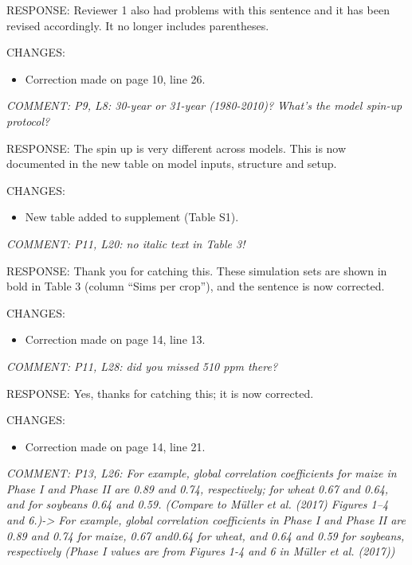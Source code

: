 \documentclass[gmd, manuscript]{copernicus} %
\begin{document}
RESPONSE: Reviewer 1 also had problems with this sentence and it has been revised accordingly. It no longer includes parentheses.
\smallskip

CHANGES:
\begin{itemize}
    \item Correction made on page 10, line 26.
\end{itemize}

\smallskip

\textcolor{dark-gray}{\textit{COMMENT: P9, L8: 30-year or 31-year (1980-2010)? What’s the model spin-up protocol?}}

RESPONSE: The spin up is very different across models. This is now documented in the new table on model inputs, structure and setup.
\smallskip

CHANGES:
\begin{itemize}
    \item New table added to supplement (Table S1).
\end{itemize}

\smallskip

\textcolor{dark-gray}{\textit{COMMENT: P11, L20: no italic text in Table 3!}}

RESPONSE: Thank you for catching this. These simulation sets are shown in bold in Table 3 (column “Sims per crop”), and the sentence is now corrected.
\smallskip

CHANGES:
\begin{itemize}
    \item Correction made on page 14, line 13.
\end{itemize}

\smallskip

\textcolor{dark-gray}{\textit{COMMENT: P11, L28: did you missed 510 ppm there?}}

RESPONSE: Yes, thanks for catching this; it is now corrected.
\smallskip

CHANGES:
\begin{itemize}
    \item Correction made on page 14, line 21.
\end{itemize}

\smallskip

\textcolor{dark-gray}{\textit{COMMENT: P13, L26: For example, global correlation coefficients for maize in Phase I and Phase II are 0.89 and 0.74, respectively; for wheat 0.67 and 0.64, and for soybeans 0.64 and 0.59. (Compare to Müller et al. (2017) Figures 1–4 and 6.)-> For example, global correlation coefficients in Phase I and Phase II are 0.89 and 0.74 for maize, 0.67 and0.64 for wheat, and 0.64 and 0.59 for soybeans, respectively (Phase I values are from Figures 1-4 and 6 in Müller et al. (2017))}}
\end{document}

